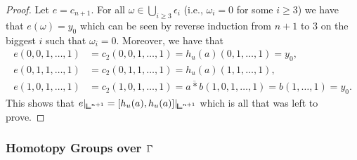 \begin{proof}
Let $e = c_{n+1}$.
For all $\omega\in\bigcup_{i\geq 3}\epsilon_i$ (i.e., $\omega_i=0$ for some $i\geq 3$) we have that $e(\omega) = y_0$
which can be seen by reverse induction from $n+1$ to $3$ on the biggest $i$ such that $\omega_i=0$.
Moreover, we have that
\begin{align*}
    e(0,0,1,\ldots,1) &= c_2(0,0,1,\ldots,1) = h_{u}(a)(0,1,\ldots,1) = y_0, \\
    e(0,1,1,\ldots,1) &= c_2(0,1,1,\ldots,1) = h_{u}(a)(1,1,\ldots,1), \\
    e(1,0,1,\ldots,1) &= c_2(1,0,1,\ldots,1) = \overline{a*b}(1,0,1,\ldots,1) = b(1,\ldots,1) = y_0.
\end{align*}
This shows that $e\rvert_{{\bbcor}^{n+1}} = [h_u(a),h_u(a)]\rvert_{{\bbcor}^{n+1}}$
which is all that was left to prove.
\end{proof}



\subsubsection{Homotopy Groups over \texorpdfstring{$\bbGamma$}{Gamma}}\label{ssec:structure-group-gamma}

